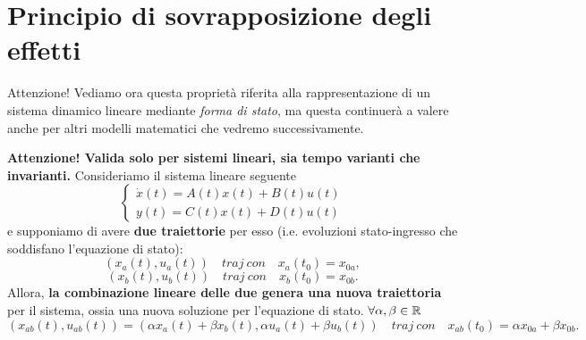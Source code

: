 \documentclass[a4paper]{report}
\begin{document}
\section{Principio di sovrapposizione degli effetti}
Attenzione! Vediamo ora questa proprietà riferita alla rappresentazione di un sistema dinamico lineare mediante\textit{ forma di stato}, ma questa continuerà a valere anche per altri modelli matematici che vedremo successivamente.
\bb
\begin{defin}{}{}
\textbf{Attenzione! Valida solo per sistemi lineari, sia tempo varianti che invarianti.}
	\bb
	Consideriamo il sistema lineare seguente
	\begin{equation*}
	\begin{cases}
		\dot x(t) = A(t)x(t) + B(t)u(t) \\
		y(t) = C(t)x(t) +D(t)u(t)
	\end{cases}
	\end{equation*}
	e supponiamo di avere \textbf{due traiettorie} per esso (i.e. evoluzioni stato-ingresso che soddisfano l'equazione di stato):
	\begin{equation*}
		(x_a(t), u_a(t))\quad traj \ con \quad  x_a(t_0)=x_{0a},
	\end{equation*}
		\begin{equation*}
		(x_b(t), u_b(t))\quad traj \ con \quad x_b(t_0)=x_{0b}.
	\end{equation*}
Allora, \textbf{la combinazione lineare delle due genera una nuova traiettoria} per il sistema, ossia una nuova soluzione per l'equazione di stato. $\forall \alpha, \beta \in \mathbb{R}$
	\begin{equation}
		(x_{ab}(t), u_{ab}(t)) = (\alpha x_a(t)+\beta x_b(t), \alpha u_a(t) + \beta u_b(t)) \quad traj \ con \quad x_{ab}(t_0) = \alpha x_{0a} + \beta x_{0b}.
	\end{equation}
\end{defin}
\end{document}
